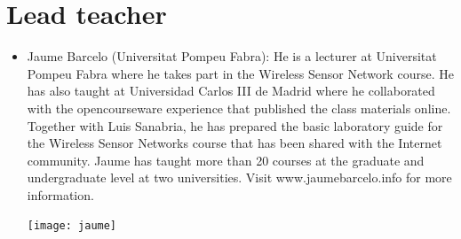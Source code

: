 \documentclass[a4paper,oneside]{book}   %
\begin{document}
\section{Lead teacher}
\begin{itemize}
\item Jaume Barcelo (Universitat Pompeu Fabra): He is a lecturer at Universitat Pompeu Fabra where he takes part in the Wireless Sensor Network course. He has also taught at Universidad Carlos III de Madrid where he collaborated with the opencourseware experience that published the class materials online. Together with Luis Sanabria, he has prepared the basic laboratory guide for the Wireless Sensor Networks course that has been shared with the Internet community. Jaume has taught more than 20 courses at the graduate and undergraduate level at two universities. Visit www.jaumebarcelo.info for more information.
\begin{center}
\texttt{[image: jaume]}
\label{fig:jaume}
\end{center}
\end{itemize}
\end{document}
